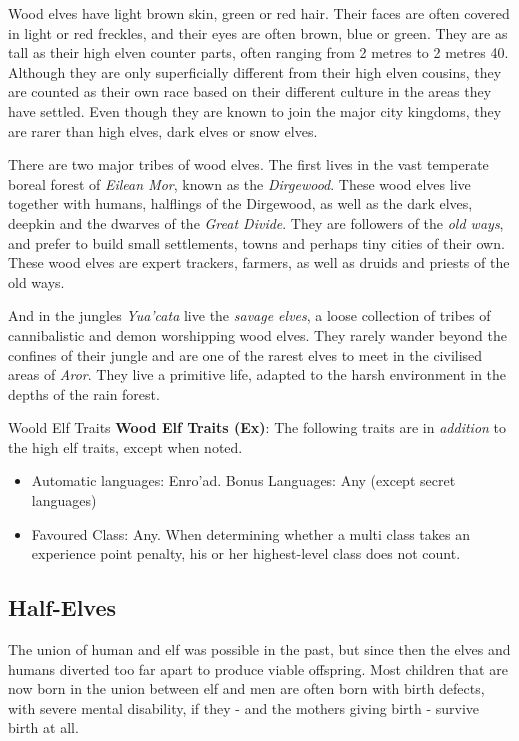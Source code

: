 Wood elves have light brown skin, green or red hair. Their faces are often
covered in light or red freckles, and their eyes are often brown, blue or
green. They are as tall as their high elven counter parts, often ranging from
2 metres to 2 metres 40. Although they are only superficially different from
their high elven cousins, they are counted as their own race based on their
different culture in the areas they have settled. Even though they are known
to join the major city kingdoms, they are rarer than high elves, dark elves or
snow elves.

There are two major tribes of wood elves. The first lives in the vast
temperate boreal forest of \emph{Eilean Mor}, known as the \emph{Dirgewood}.
These wood elves live together with humans, halflings of the Dirgewood, as
well as the dark elves, deepkin and the dwarves of the \emph{Great Divide}.
They are followers of the \emph{old ways}, and prefer to build small
settlements, towns and perhaps tiny cities of their own. These wood elves are
expert trackers, farmers, as well as druids and priests of the old ways.

And in the jungles \emph{Yua'cata} live the \emph{savage elves}, a loose
collection of tribes of cannibalistic and demon worshipping wood elves. They
rarely wander beyond the confines of their jungle and are one of the rarest
elves to meet in the civilised areas of \emph{Aror}. They live a primitive
life, adapted to the harsh environment in the depths of the rain forest.

\begin{35e}{Woold Elf Traits}
  \textbf{Wood Elf Traits (Ex)}: The following traits are in \emph{addition}
  to the high elf traits, except when noted.
  \begin{itemize}[noitemsep]
    \item Automatic languages: Enro'ad. Bonus Languages: Any (except secret
      languages)
    \item Favoured Class: Any. When determining whether a multi class takes an
    experience point penalty, his or her highest-level class does not count.
  \end{itemize}
\end{35e}

\subsection{Half-Elves}
\label{sec:Half-Elves}

The union of human and elf was possible in the past, but since then the elves
and humans diverted too far apart to produce viable offspring. Most children
that are now born in the union between elf and men are often born with birth
defects, with severe mental disability, if they - and the mothers giving
birth - survive birth at all.

